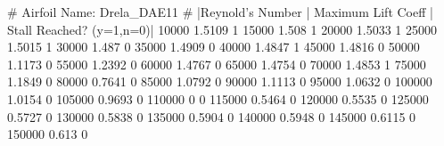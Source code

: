 # Airfoil Name: Drela_DAE11
# |Reynold's Number | Maximum Lift Coeff | Stall Reached? (y=1,n=0)|
10000 1.5109 1
15000 1.508 1
20000 1.5033 1
25000 1.5015 1
30000 1.487 0
35000 1.4909 0
40000 1.4847 1
45000 1.4816 0
50000 1.1173 0
55000 1.2392 0
60000 1.4767 0
65000 1.4754 0
70000 1.4853 1
75000 1.1849 0
80000 0.7641 0
85000 1.0792 0
90000 1.1113 0
95000 1.0632 0
100000 1.0154 0
105000 0.9693 0
110000 0 0
115000 0.5464 0
120000 0.5535 0
125000 0.5727 0
130000 0.5838 0
135000 0.5904 0
140000 0.5948 0
145000 0.6115 0
150000 0.613 0
